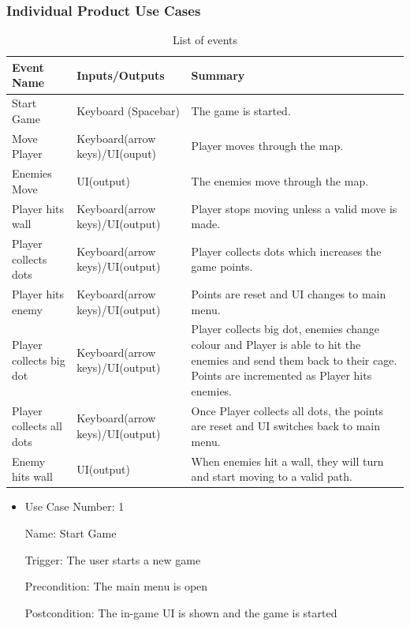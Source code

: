 \documentclass[12pt, titlepage]{article}
\begin{document}
\subsubsection{Individual Product Use Cases}

\begin{table}[H]
\caption{List of events} \label{tab:events}
\begin{tabularx}{\textwidth}{| p{3cm} | p{4cm} | X |}
\toprule {\bf Event Name} & {\bf Inputs/Outputs} & {\bf Summary}\\
\midrule
Start Game & Keyboard (Spacebar) & The game is started.\\ \hline
Move Player & Keyboard(arrow keys)/UI(ouput) & Player moves through the map.\\ \hline
Enemies Move & UI(output) & The enemies move through the map.\\ \hline
Player hits wall & Keyboard(arrow keys)/UI(output) & Player stops moving unless a valid move is made.\\ \hline
Player collects dots & Keyboard(arrow keys)/UI(output) & Player collects dots which increases the game points.\\ \hline
Player hits enemy & Keyboard(arrow keys)/UI(output) & Points are reset and UI changes to main menu.\\ \hline
Player collects big dot & Keyboard(arrow keys)/UI(output) & Player collects big dot, enemies change colour and Player is able to hit the enemies and send them back to their cage. Points are incremented as Player hits enemies.\\ \hline
Player collects all dots & Keyboard(arrow keys)/UI(output) & Once Player collects all dots, the points are reset and UI switches back to main menu.\\ \hline
Enemy hits wall & UI(output) & When enemies hit a wall, they will turn and start moving to a valid path.\\
\bottomrule
\end{tabularx}
\end{table}

\begin{itemize}
\item
Use Case Number: 1

Name: Start Game

Trigger: The user starts a new game

Precondition: The main menu is open

Postcondition: The in-game UI is shown and the game is started

\end{itemize}
\end{document}
